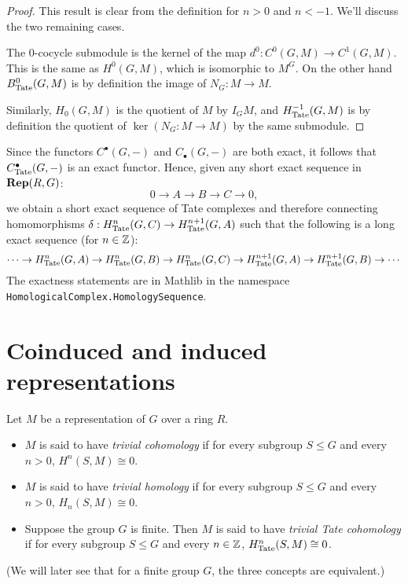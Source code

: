 \begin{proof}
	This result is clear from the definition for $n > 0$ and $n < -1$. We'll discuss
	the two remaining cases.

	The $0$-cocycle submodule is the kernel of the map $d^0 : C^0(G,M) \to C^1(G,M)$.
	This is the same as $H^0(G,M)$, which is isomorphic to $M^G$.
	On the other hand $B^0_{\mathrm{Tate}}(G,M)$ is by definition the image of $N_G : M \to M$.

	Similarly, $H_0(G,M)$ is the quotient of $M$ by $I_GM$,
	and $H^{-1}_{\mathrm{Tate}}(G,M)$ is by definition the quotient of $\ker(N_G : M \to M)$
	by the same submodule.
\end{proof}

\begin{definition}	\label{def:Tate long exact sequence}
	\leanok
  Since the functors $C^\bullet(G,-)$ and $C_\bullet(G,-)$ are both exact, it follows
	that $C^\bullet_{\mathrm{Tate}}(G,-)$ is an exact functor.
	Hence, given any short exact sequence in $\mathbf{Rep}(R,G)$:
	\[
		0 \to A \to B \to C \to 0,
	\]
	we obtain a short exact sequence of Tate complexes and therefore
	connecting homomorphisms $\delta : H^n_{\mathrm{Tate}}(G,C) \to H^{n+1}_{\mathrm{Tate}}(G,A)$
	such that the following is a long exact sequence (for $n \in {\mathbb Z}$):
	\[
		\cdots \to H^n_{\mathrm{Tate}}(G,A) \to H^n_{\mathrm{Tate}}(G,B) \to H^n_{\mathrm{Tate}}(G,C)
		\to H^{n+1}_{\mathrm{Tate}}(G,A) \to H^{n+1}_{\mathrm{Tate}}(G,B) \to \cdots
	\]
	The exactness statements are in Mathlib in the namespace
	\texttt{HomologicalComplex.HomologySequence}.
\end{definition}





\section{Coinduced and induced representations}

\begin{definition} \label{def:trivial cohomology}
	\leanok
	Let $M$ be a representation of $G$ over a ring $R$.
	\begin{itemize}
		\item
		$M$ is said to have \emph{trivial cohomology} if for every subgroup $S \le G$
		and every $n > 0$, $H^n(S,M) \cong 0$.
		\item
		$M$ is said to have \emph{trivial homology} if for every subgroup $S \le G$
		and every $n > 0$, $H_n(S,M) \cong 0$.
		\item
		Suppose the group $G$ is finite. Then $M$ is said to have \emph{trivial Tate cohomology} if for every subgroup $S \le G$
		and every $n \in {\mathbb Z}$, $H^n_{\mathrm{Tate}}(S,M) \cong 0$.
	\end{itemize}
	(We will later see that for a finite group $G$, the three concepts are equivalent.)
\end{definition}

